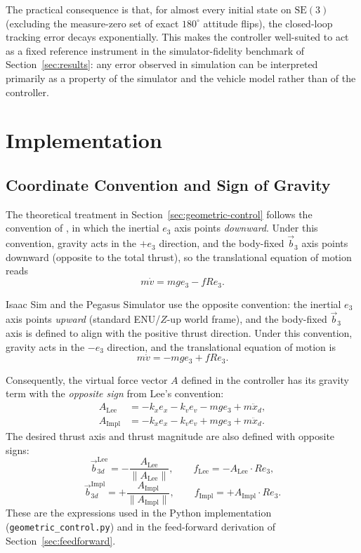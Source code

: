 \documentclass[11pt]{article}
\theoremstyle{remark}
\newcommand{\se}{\mathrm{SE}(3)}
\begin{document}
The practical consequence is that, for almost every initial state on $\se$ (excluding the measure-zero set of exact $180^\circ$ attitude flips), the closed-loop tracking error decays exponentially. This makes the controller well-suited to act as a fixed reference instrument in the simulator-fidelity benchmark of Section~\ref{sec:results}: any error observed in simulation can be interpreted primarily as a property of the simulator and the vehicle model rather than of the controller.


\section{Implementation}
\label{sec:implementation}

\subsection{Coordinate Convention and Sign of Gravity}
\label{sec:convention}
The theoretical treatment in Section~\ref{sec:geometric-control} follows the convention of \cite{Lee2010CDC}, in which the inertial $e_3$ axis points \emph{downward}. Under this convention, gravity acts in the $+e_3$ direction, and the body-fixed $\vec{b}_3$ axis points downward (opposite to the total thrust), so the translational equation of motion reads
\begin{equation}
    m\dot v = mg e_3 - f R e_3. \tag{Lee}\label{eq:vdot-lee}
\end{equation}

Isaac Sim and the Pegasus Simulator use the opposite convention: the inertial $e_3$ axis points \emph{upward} (standard ENU/$Z$-up world frame), and the body-fixed $\vec{b}_3$ axis is defined to align with the positive thrust direction. Under this convention, gravity acts in the $-e_3$ direction, and the translational equation of motion is
\begin{equation}
    m\dot v = -mg e_3 + f R e_3. \tag{Impl}\label{eq:vdot-impl}
\end{equation}

Consequently, the virtual force vector $A$ defined in the controller has its gravity term with the \emph{opposite sign} from Lee's convention:
\begin{align}
A_{\text{Lee}}  &= -k_x e_x - k_v e_v - m g e_3 + m \ddot x_d, \label{eq:A-lee}\\
A_{\text{Impl}} &= -k_x e_x - k_v e_v + m g e_3 + m \ddot x_d. \label{eq:A-impl}
\end{align}
The desired thrust axis and thrust magnitude are also defined with opposite signs:
\[
\vec{b}_{3d}^{\text{Lee}}  = -\frac{A_{\text{Lee}}}{\|A_{\text{Lee}}\|},\qquad f_{\text{Lee}} = -A_{\text{Lee}} \cdot R e_3,
\]
\[
\vec{b}_{3d}^{\text{Impl}} = +\frac{A_{\text{Impl}}}{\|A_{\text{Impl}}\|},\qquad f_{\text{Impl}} = +A_{\text{Impl}} \cdot R e_3.
\]
These are the expressions used in the Python implementation (\texttt{geometric\_control.py}) and in the feed-forward derivation of Section~\ref{sec:feedforward}.
\end{document}
